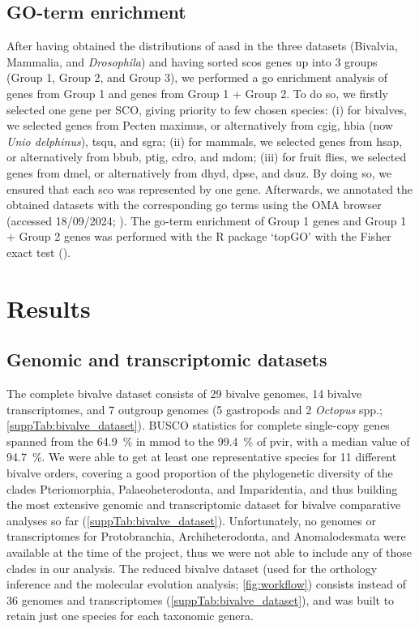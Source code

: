 \subsection{GO-term enrichment}
After having obtained the distributions of \gls{aasd} in the three datasets (Bivalvia, Mammalia, and \textit{Drosophila}) and having sorted \glspl{sco} genes up into 3 groups (Group 1, Group 2, and Group 3), we performed a \gls{go} enrichment analysis of genes from Group 1 and genes from Group 1 + Group 2. To do so, we firstly selected one gene per SCO, giving priority to few chosen species: (i) for bivalves, we selected genes from Pecten maximus, or alternatively from \gls{cgig}, \gls{hbia} (now \textit{Unio delphinus}), \gls{tsqu}, and \gls{sgra}; (ii) for mammals, we selected genes from \gls{hsap}, or alternatively from \gls{bbub}, \gls{ptig}, \gls{cdro}, and \gls{mdom}; (iii) for fruit flies, we selected genes from \gls{dmel}, or alternatively from \gls{dhyd}, \gls{dpse}, and \gls{dsuz}. By doing so, we ensured that each \gls{sco} was represented by one gene. Afterwards, we annotated the obtained datasets with the corresponding \gls{go} terms using the OMA browser (accessed 18/09/2024; ). The \gls{go}-term enrichment of Group 1 genes and Group 1 + Group 2 genes was performed with the R package ‘topGO’ with the Fisher exact test ().

\section{Results} \label{chapter:molecularEvolution-results}
\subsection{Genomic and transcriptomic datasets}
The complete bivalve dataset consists of 29 bivalve genomes, 14 bivalve transcriptomes, and 7 outgroup genomes (5 gastropods and 2 \textit{Octopus} spp.; \cref{suppTab:bivalve_dataset}). BUSCO statistics for complete single-copy genes spanned from the \qty{64.9}{\percent} in \gls{mmod} to the \qty{99.4}{\percent} of \gls{pvir}, with a median value of \qty{94.7}{\percent}. We were able to get at least one representative species for 11 different bivalve orders, covering a good proportion of the phylogenetic diversity of the clades Pteriomorphia, Palaeoheterodonta, and Imparidentia, and thus building the most extensive genomic and transcriptomic dataset for bivalve comparative analyses so far (\cref{suppTab:bivalve_dataset}). Unfortunately, no genomes or transcriptomes for Protobranchia, Archiheterodonta, and Anomalodesmata were available at the time of the project, thus we were not able to include any of those clades in our analysis. The reduced bivalve dataset (used for the orthology inference and the molecular evolution analysis; \cref{fig:workflow}) consists instead of 36 genomes and transcriptomes (\cref{suppTab:bivalve_dataset}), and was built to retain just one species for each taxonomic genera.


